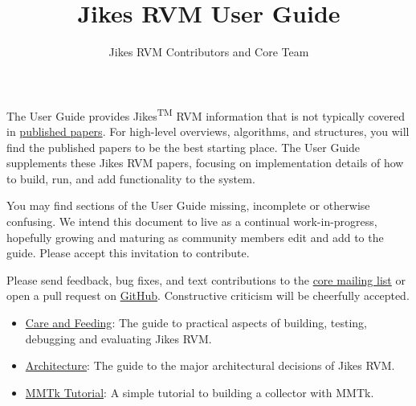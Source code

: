 \documentclass[a4paper]{book}
\title{Jikes RVM User Guide}
\author{Jikes RVM Contributors and Core Team}
\begin{document}
\maketitle

\pdftableofcontents



The User Guide provides Jikes\textsuperscript{TM} RVM information that is not typically covered in \href{http://www.jikesrvm.org/Resources/Publications/}{published papers}. For high-level overviews, algorithms, and structures, you will find the published papers to be the best starting place. The User Guide supplements these Jikes RVM papers, focusing on implementation details of how to build, run, and add functionality to the system.

You may find sections of the User Guide missing, incomplete or otherwise confusing. We intend this document to live as a continual work-in-progress, hopefully growing and maturing as community members edit and add to the guide. Please accept this invitation to contribute.

Please send feedback, bug fixes, and text contributions to the \href{http://www.jikesrvm.org/MailingLists/}{core mailing list} or open a pull request on \href{https://github.com/JikesRVM/jikesrvm.github.io/}{GitHub}. Constructive criticism will be cheerfully accepted.

\begin{itemize}
  \item \hyperref[part:careandfeeding]{Care and Feeding}: The guide to practical aspects of building, testing, debugging and evaluating Jikes RVM.
  \item \hyperref[part:architecture]{Architecture}: The guide to the major architectural decisions of Jikes RVM.
  \item \hyperref[part:mmtktutorial]{MMTk Tutorial}: A simple tutorial to building a collector with MMTk.
\end{itemize}
\end{document}
